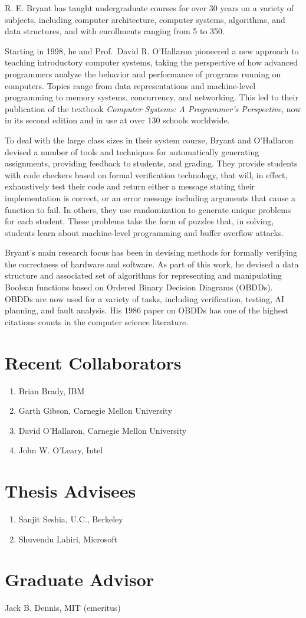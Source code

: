 \documentclass{article}
\newenvironment{denseenumerate}%
	{\begin{enumerate}\setlength{\itemsep}{0pt}\setlength{\parsep}{0pt}}%
	{\end{enumerate}}
\begin{document}
R. E. Bryant has taught undergraduate courses for over 30 years on a
variety of subjects, including computer architecture,
computer systems, algorithms, and data structures, and with enrollments
ranging from 5 to 350.  

Starting in 1998, he and Prof.~David R. O'Hallaron pioneered a new
approach to teaching introductory computer systems, taking the
perspective of how advanced programmers analyze the behavior and
performance of programs running on computers.  Topics range from data
representations and machine-level programming to memory systems,
concurrency, and networking.  This led to their publication of the
textbook {\em Computer Systems: A Programmer's Perspective}, now in
its second edition and in use at over 130 schools worldwide.

To deal with the large class sizes in their system course, Bryant and
O'Hallaron devised a number of tools and techniques for automatically
generating assignments, providing feedback to students, and grading.
They provide students with code checkers based on formal verification
technology, that will, in effect, exhaustively test their code and
return either a message stating their implementation is correct, or an
error message including arguments that cause a function to fail.  In
others, they use randomization to generate unique problems for each
student.  These problems take the form of puzzles that, in solving,
students learn about machine-level programming and buffer overflow
attacks.

Bryant's main research focus has been in devising methods for formally
verifying the correctness of hardware and software.  As part of this
work, he devised a data structure and associated set of algorithms for
representing and manipulating Boolean functions based on Ordered
Binary Decision Diagrams (OBDDs).  OBDDs are now used for a variety of
tasks, including verification, testing, AI planning, and fault
analysis.  His 1986 paper on OBDDs has one of the highest citations
counts in the computer science literature.

\section*{Recent Collaborators}
\begin{denseenumerate}
\item Brian Brady, IBM
\item Garth Gibson, Carnegie Mellon University
\item David O'Hallaron, Carnegie Mellon University
\item John W. O'Leary, Intel
\end{denseenumerate}

\section*{Thesis Advisees}
\begin{denseenumerate}
\item Sanjit Seshia, U.C., Berkeley
\item Shuvendu Lahiri, Microsoft
\end{denseenumerate}

\section*{Graduate Advisor}
Jack B. Dennis, MIT (emeritus)


%
\end{document}
